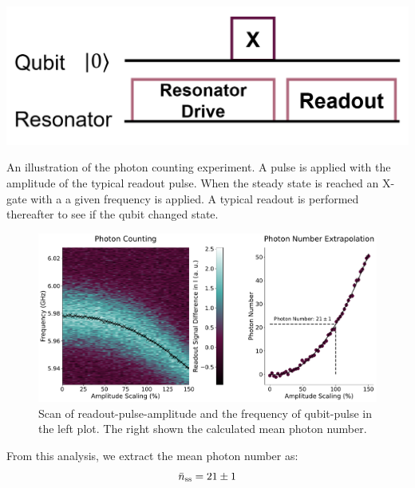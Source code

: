 \begin{marginfigure}[-4 cm]
    \centering
    \includegraphics{Figs/circuits/photon_counting.png}
    \caption{An illustration of the photon counting experiment. A pulse is applied with the amplitude of the typical readout pulse. When the steady state is reached an X-gate with a a given frequency is applied. A typical readout is performed thereafter to see if the qubit changed state.}
    \label{fig:photon_counting_circuit}
\end{marginfigure}

\begin{figure}[h]
    \centering
    \includegraphics[width = \linewidth]{Calibrations/Figures/photon_number.pdf}
    \caption{Scan of readout-pulse-amplitude and the frequency of qubit-pulse in the left plot. The right shown the calculated mean photon number.}
    \label{fig:calibration_photon_counting_scan}
\end{figure}
From this analysis, we extract the mean photon number as:
\begin{equation}
    \Bar{n}_{\text{ss}} = 21 \pm 1
\end{equation}

